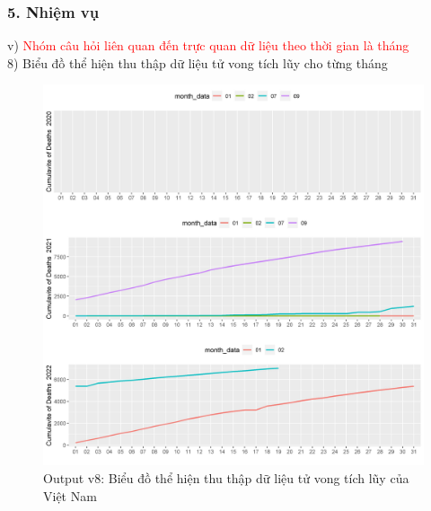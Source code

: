 \documentclass[english,10pt,table]{beamer}
\begin{document}
\begin{frame}[fragile]
\frametitle{5.  Nhiệm vụ}
v) \textcolor{red}{Nhóm câu hỏi liên quan đến trực quan dữ liệu theo thời gian là tháng}\\
    8) Biểu đồ thể hiện thu thập dữ liệu tử vong tích lũy cho từng tháng
	\begin{figure}[h!]
	\begin{center}
		    \includegraphics[scale = 0.26]{Images/V/v8 Vietnam .jpeg}
		     \caption{Output v8: Biểu đồ thể hiện thu thập dữ liệu tử vong tích lũy của Việt Nam}
		\end{center}
		\end{figure}
\end{frame}
\end{document}
